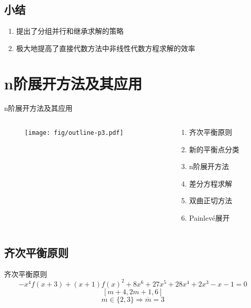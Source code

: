 \documentclass[handout]{beamer}
\newcommand{\Painleve}{Painlev{\'e}}
\begin{document}
\subsection{小结}
\begin{frame}
\begin{enumerate}
\item 提出了分组并行和继承求解的策略
\item 极大地提高了直接代数方法中非线性代数方程求解的效率
\end{enumerate}
\end{frame}

\section{n阶展开方法及其应用}
\begin{frame}{n阶展开方法及其应用}
\begin{columns}
\begin{column}{0.5\textwidth}
  \begin{figure}
    \centering
    \texttt{[image: fig/outline-p3.pdf]}
  \end{figure}
\end{column}
\begin{column}{0.5\textwidth}
  \begin{enumerate}
  \item 齐次平衡原则
  \item 新的平衡点分类
  \item n阶展开方法
  \item 差分方程求解
  \item 双曲正切方法 
  \item \Painleve{}展开
  \end{enumerate}
\end{column}
\end{columns}
\end{frame}

\subsection{齐次平衡原则}
\begin{frame}{齐次平衡原则}
\[
    -x^4f(x+3)+(x+1)f(x)^2+8x^6+27x^5+28x^4+2x^3-x-1=0
\]
\[
    [m+4,2m+1,6]
\]
\[
    m\in \{2,3\} \Rightarrow \overline{m}=3
\]
\end{frame}
\end{document}

